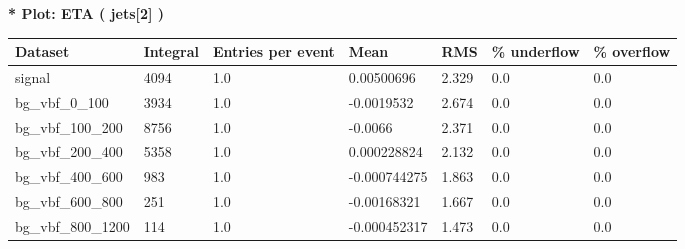 \documentclass[a4paper, 10pt]{article}
\begin{document}
\textbf{* Plot: ETA ( jets[2] ) }\\
   \begin{table}[H]
  \begin{center}
    \begin{tabular}{|m{23.0mm}|m{23.0mm}|m{18.0mm}|m{19.0mm}|m{19.0mm}|m{19.0mm}|m{19.0mm}|}
      \hline
      {\cellcolor{yellow}         Dataset}& {\cellcolor{yellow}         Integral}& {\cellcolor{yellow}         Entries per event}& {\cellcolor{yellow}         Mean}& {\cellcolor{yellow}         RMS}& {\cellcolor{yellow}         \% underflow}& {\cellcolor{yellow}         \% overflow}\\
      \hline
      {\cellcolor{white}         signal}& {\cellcolor{white}         4094}& {\cellcolor{white}         1.0}& {\cellcolor{white}         0.00500696}& {\cellcolor{white}         2.329}& {\cellcolor{green}         0.0}& {\cellcolor{green}         0.0}\\
      \hline
      {\cellcolor{white}         bg\_vbf\_0\_100}& {\cellcolor{white}         3934}& {\cellcolor{white}         1.0}& {\cellcolor{white}         -0.0019532}& {\cellcolor{white}         2.674}& {\cellcolor{green}         0.0}& {\cellcolor{green}         0.0}\\
      \hline
      {\cellcolor{white}         bg\_vbf\_100\_200}& {\cellcolor{white}         8756}& {\cellcolor{white}         1.0}& {\cellcolor{white}         -0.0066}& {\cellcolor{white}         2.371}& {\cellcolor{green}         0.0}& {\cellcolor{green}         0.0}\\
      \hline
      {\cellcolor{white}         bg\_vbf\_200\_400}& {\cellcolor{white}         5358}& {\cellcolor{white}         1.0}& {\cellcolor{white}         0.000228824}& {\cellcolor{white}         2.132}& {\cellcolor{green}         0.0}& {\cellcolor{green}         0.0}\\
      \hline
      {\cellcolor{white}         bg\_vbf\_400\_600}& {\cellcolor{white}         983}& {\cellcolor{white}         1.0}& {\cellcolor{white}         -0.000744275}& {\cellcolor{white}         1.863}& {\cellcolor{green}         0.0}& {\cellcolor{green}         0.0}\\
      \hline
      {\cellcolor{white}         bg\_vbf\_600\_800}& {\cellcolor{white}         251}& {\cellcolor{white}         1.0}& {\cellcolor{white}         -0.00168321}& {\cellcolor{white}         1.667}& {\cellcolor{green}         0.0}& {\cellcolor{green}         0.0}\\
      \hline
      {\cellcolor{white}         bg\_vbf\_800\_1200}& {\cellcolor{white}         114}& {\cellcolor{white}         1.0}& {\cellcolor{white}         -0.000452317}& {\cellcolor{white}         1.473}& {\cellcolor{green}         0.0}& {\cellcolor{green}         0.0}\\

\end{tabular}
\end{center}
\end{table}
\end{document}
